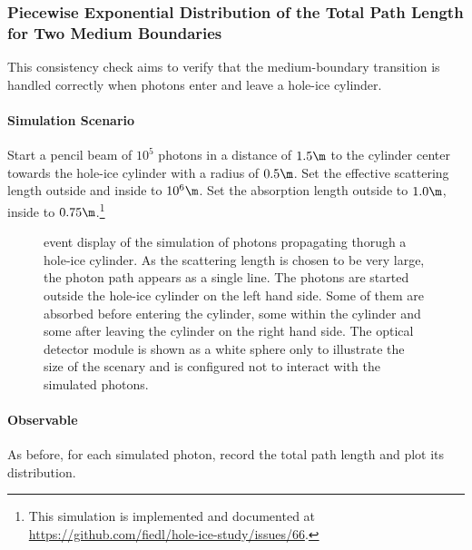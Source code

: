

\subsubsection{Piecewise Exponential Distribution of the Total Path Length for Two Medium Boundaries}


This consistency check aims to verify that the medium-boundary transition is handled correctly when photons enter and leave a hole-ice cylinder.

\paragraph{Simulation Scenario} Start a pencil beam of $10^5$ photons in a distance of $1.5\m$ to the cylinder center towards the hole-ice cylinder with a radius of $0.5\m$. Set the effective scattering length outside and inside to $10^6\m$. Set the absorption length outside to $1.0\m$, inside to $0.75\m$.\footnote{This simulation is implemented and documented at \url{https://github.com/fiedl/hole-ice-study/issues/66}.}


\begin{figure}
  \caption{ event display of the simulation of photons propagating thorugh a hole-ice cylinder. As the scattering length is chosen to be very large, the photon path appears as a single line.  The photons are started outside the hole-ice cylinder on the left hand side. Some of them are absorbed before entering the cylinder, some within the cylinder and some after leaving the cylinder on the right hand side. The optical detector module is shown as a white sphere only to illustrate the size of the scenary and is configured not to interact with the simulated photons.}
\end{figure}

\paragraph{Observable} As before, for each simulated photon, record the total path length and plot its distribution.

